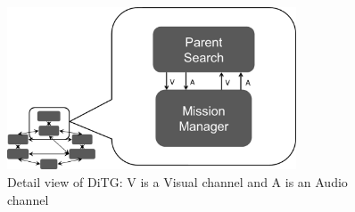 \begin{figure}[hbt]
\center
\setlength{\abovecaptionskip}{1mm}
\setlength{\belowcaptionskip}{1mm}
\setlength{\textfloatsep}{1mm}
\setlength{\floatsep}{1mm}
\includegraphics[height=1.9in]{ditg_detailed.png}
\caption{Detail view of DiTG: V is a Visual channel and A is an Audio channel}
\label{fig:ditg_detail}
\end{figure}


%
%

%


